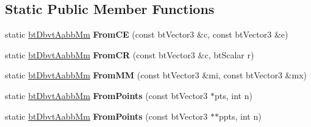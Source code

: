 \subsection*{Static Public Member Functions}
\begin{DoxyCompactItemize}
\item 
\hypertarget{structbt_dbvt_aabb_mm_a52a6e09165ec39384a06d69630e88b53}{static \hyperlink{structbt_dbvt_aabb_mm}{bt\+Dbvt\+Aabb\+Mm} {\bfseries From\+C\+E} (const bt\+Vector3 \&c, const bt\+Vector3 \&e)}\label{structbt_dbvt_aabb_mm_a52a6e09165ec39384a06d69630e88b53}

\item 
\hypertarget{structbt_dbvt_aabb_mm_a6b9b2b5b6361d2b56285ce18733e2092}{static \hyperlink{structbt_dbvt_aabb_mm}{bt\+Dbvt\+Aabb\+Mm} {\bfseries From\+C\+R} (const bt\+Vector3 \&c, bt\+Scalar r)}\label{structbt_dbvt_aabb_mm_a6b9b2b5b6361d2b56285ce18733e2092}

\item 
\hypertarget{structbt_dbvt_aabb_mm_a421d031c65294920c84fbde27ab3ceca}{static \hyperlink{structbt_dbvt_aabb_mm}{bt\+Dbvt\+Aabb\+Mm} {\bfseries From\+M\+M} (const bt\+Vector3 \&mi, const bt\+Vector3 \&mx)}\label{structbt_dbvt_aabb_mm_a421d031c65294920c84fbde27ab3ceca}

\item 
\hypertarget{structbt_dbvt_aabb_mm_a7fc02287ebb84bce64a346e4414d6280}{static \hyperlink{structbt_dbvt_aabb_mm}{bt\+Dbvt\+Aabb\+Mm} {\bfseries From\+Points} (const bt\+Vector3 $\ast$pts, int n)}\label{structbt_dbvt_aabb_mm_a7fc02287ebb84bce64a346e4414d6280}

\item 
\hypertarget{structbt_dbvt_aabb_mm_ac2d61085ef2aa7900e38fcb9fc63c5a5}{static \hyperlink{structbt_dbvt_aabb_mm}{bt\+Dbvt\+Aabb\+Mm} {\bfseries From\+Points} (const bt\+Vector3 $\ast$$\ast$ppts, int n)}\label{structbt_dbvt_aabb_mm_ac2d61085ef2aa7900e38fcb9fc63c5a5}

\end{DoxyCompactItemize}
